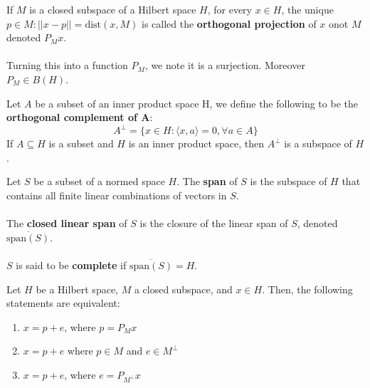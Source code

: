 \documentclass[12pt]{article}
\newenvironment{theorem}[2][Theorem]{\begin{trivlist}
\item[\hskip \labelsep {\bfseries #1}\hskip \labelsep {\bfseries #2.}]}{\end{trivlist}}
\newenvironment{definition}[2][Definition]{\begin{trivlist}
\item[\hskip \labelsep {\bfseries #1}\hskip \labelsep {\bfseries #2.}]}{\end{trivlist}}
\begin{document}
\begin{definition}{(Orthogonal Projection)}
    If $M$ is a closed subspace of a Hilbert space $H$, for every $x \in H$, the unique $p \in M : ||x - p|| = \text{dist}(x, M)$ is called the \textbf{orthogonal projection} of $x$ onot $M$ denoted $P_M x$. \\ \\
    Turning this into a function $P_M$, we note it is a surjection. Moreover $P_M \in B(H)$. 
\end{definition}

\begin{definition}{(Orthogonal Complement)}
    Let $A$ be a subset of an inner product space H, we define the following to be the \textbf{orthogonal complement of A}:
    \begin{equation}
        A^\perp = \{x \in H : \langle x , a \rangle = 0, \forall a \in A\}
    \end{equation}
    If $A \subseteq H$ is a subset and $H$ is an inner product space, then $A^\perp$ is a subspace of $H$.
\end{definition}

\begin{definition}{(Spans and Completeness)}
    Let $S$ be a subset of a normed space $H$. The \textbf{span} of $S$ is the subspace of $H$ that contains all finite linear combinations of vectors in $S$. \\ \\
    The \textbf{closed linear span} of $S$ is the closure of the linear span of $S$, denoted $\overline{\text{span}(S)}$. \\ \\
    $S$ is said to be \textbf{complete} if $\overline{\text{span}(S)} = H$.
\end{definition}

\begin{theorem}{(Orthogonal Decomposition)}
    Let $H$ be a Hilbert space, $M$ a closed subspace, and $x \in H$. Then, the following statements are equivalent:
    \begin{enumerate}[label=(\alph*)]
        \item $x = p + e$, where $p = P_M x$
        \item $x = p + e$ where $p \in M$ and $e \in M^\perp$
        \item $x = p + e$, where $e = P_{M^\perp} x$
    \end{enumerate}
\end{theorem}
\end{document}
